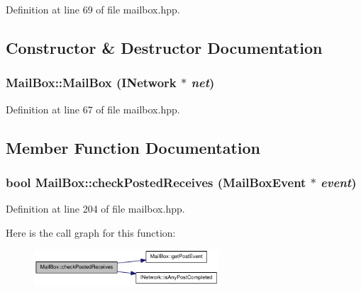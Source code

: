 Definition at line 69 of file mailbox.hpp.

\subsection{Constructor \& Destructor Documentation}
\hypertarget{class_mail_box_a534ac0f734937aa7f2409bea4da8de16}{
\subsubsection[{MailBox}]{\setlength{\rightskip}{0pt plus 5cm}MailBox::MailBox ({\bf INetwork} $\ast$ {\em net})}}
\label{class_mail_box_a534ac0f734937aa7f2409bea4da8de16}


Definition at line 67 of file mailbox.hpp.

\subsection{Member Function Documentation}
\hypertarget{class_mail_box_a0dc7cda2ef943be7763bf18494e9422d}{
\subsubsection[{checkPostedReceives}]{\setlength{\rightskip}{0pt plus 5cm}bool MailBox::checkPostedReceives ({\bf MailBoxEvent} $\ast$ {\em event})}}
\label{class_mail_box_a0dc7cda2ef943be7763bf18494e9422d}


Definition at line 204 of file mailbox.hpp.

Here is the call graph for this function:\nopagebreak
\begin{figure}[H]
\begin{center}
\leavevmode
\includegraphics[width=196pt]{class_mail_box_a0dc7cda2ef943be7763bf18494e9422d_cgraph}
\end{center}
\end{figure}


